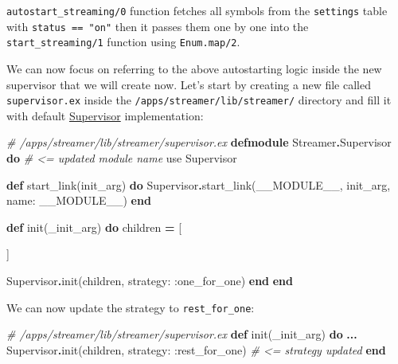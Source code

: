 \documentclass[
  oneside]{book}
\newenvironment{Shaded}{\begin{snugshade}}{\end{snugshade}}
\newcommand{\CommentTok}[1]{\textcolor[rgb]{0.56,0.35,0.01}{\textit{#1}}}
\newcommand{\ConstantTok}[1]{\textcolor[rgb]{0.00,0.00,0.00}{#1}}
\newcommand{\ImportTok}[1]{#1}
\newcommand{\KeywordTok}[1]{\textcolor[rgb]{0.13,0.29,0.53}{\textbf{#1}}}
\newcommand{\NormalTok}[1]{#1}
\newcommand{\OperatorTok}[1]{\textcolor[rgb]{0.81,0.36,0.00}{\textbf{#1}}}
\newcommand{\VariableTok}[1]{\textcolor[rgb]{0.00,0.00,0.00}{#1}}
\begin{document}
\texttt{autostart\_streaming/0} function fetches all symbols from the \texttt{settings} table with \texttt{status\ ==\ "on"} then it passes them one by one into the \texttt{start\_streaming/1} function using \texttt{Enum.map/2}.

We can now focus on referring to the above autostarting logic inside the new supervisor that we will create now. Let's start by creating a new file called \texttt{supervisor.ex} inside the \texttt{/apps/streamer/lib/streamer/} directory and fill it with default \href{https://hexdocs.pm/elixir/master/Supervisor.html\#module-module-based-supervisors}{Supervisor} implementation:

\begin{Shaded}
\begin{Highlighting}[]
\CommentTok{\# /apps/streamer/lib/streamer/supervisor.ex}
\KeywordTok{defmodule} \ConstantTok{Streamer}\OperatorTok{.}\ConstantTok{Supervisor} \KeywordTok{do} \CommentTok{\# \textless{}= updated module name}
  \ImportTok{use} \ConstantTok{Supervisor}

  \KeywordTok{def}\NormalTok{ start\_link(init\_arg) }\KeywordTok{do}
    \ConstantTok{Supervisor}\OperatorTok{.}\NormalTok{start\_link(}\ConstantTok{\_\_MODULE\_\_}\NormalTok{, init\_arg, }\VariableTok{name:} \ConstantTok{\_\_MODULE\_\_}\NormalTok{)}
  \KeywordTok{end}

  \KeywordTok{def}\NormalTok{ init(\_init\_arg) }\KeywordTok{do}
\NormalTok{    children }\OperatorTok{=}\NormalTok{ [}

\NormalTok{    ]}

    \ConstantTok{Supervisor}\OperatorTok{.}\NormalTok{init(children, }\VariableTok{strategy:} \VariableTok{:one\_for\_one}\NormalTok{)}
  \KeywordTok{end}
\KeywordTok{end}
\end{Highlighting}
\end{Shaded}

We can now update the strategy to \texttt{rest\_for\_one}:

\begin{Shaded}
\begin{Highlighting}[]
\CommentTok{\# /apps/streamer/lib/streamer/supervisor.ex}
  \KeywordTok{def}\NormalTok{ init(\_init\_arg) }\KeywordTok{do}
    \OperatorTok{...}
    \ConstantTok{Supervisor}\OperatorTok{.}\NormalTok{init(children, }\VariableTok{strategy:} \VariableTok{:rest\_for\_one}\NormalTok{) }\CommentTok{\# \textless{}= strategy updated}
  \KeywordTok{end}
\end{Highlighting}
\end{Shaded}
\end{document}
